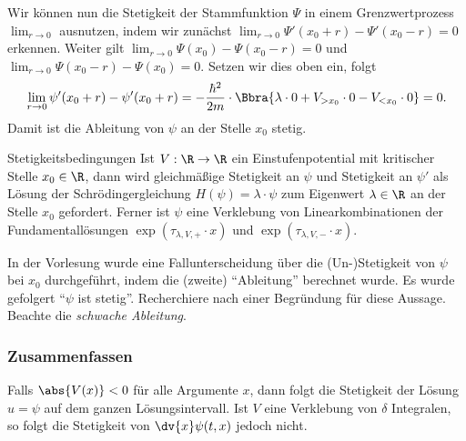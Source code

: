 \documentclass{subfiles}
\begin{document}
        Wir können nun die Stetigkeit der Stammfunktion $\Psi$ in einem Grenzwertprozess $\lim_{r\to 0}$ ausnutzen, indem wir zunächst $\lim_{r\to 0}\Psi'(x_0 + r) - \Psi'(x_0 - r) = 0$ erkennen. Weiter gilt $\lim_{r\to 0}\Psi(x_0) - \Psi(x_0 - r) = 0$ und $\lim_{r\to 0}\Psi(x_0 - r) - \Psi(x_0) = 0$. Setzen wir dies oben ein, folgt 
        \[
            \lim_{r\to 0}\psi'(x_0 + r)-\psi'(x_0 + r) = -\frac{\hbar^2}{2m}\cdot\Bbra{
                \lambda\cdot 0 + V_{>x_0}\cdot 0 - V_{<x_0}\cdot 0
            } = 0.
        \]
        Damit ist die Ableitung von $\psi$ an der Stelle $x_0$ stetig.

        \begin{mdef}{Stetigkeitsbedingungen}
            Ist $V:\R\to\R$ ein Einstufenpotential mit kritischer Stelle $x_0\in\R$, dann wird gleichmäßige Stetigkeit an $\psi$ und Stetigkeit an $\psi'$ als Lösung der Schrödingergleichung $H(\psi) = \lambda\cdot\psi$ zum Eigenwert $\lambda\in\R$ an der Stelle $x_0$ gefordert. Ferner ist $\psi$ eine Verklebung von Linearkombinationen der Fundamentallösungen $\exp(\tau_{\lambda,V,+}\cdot x)$ und $\exp(\tau_{\lambda,V,-}\cdot x)$. 
        \end{mdef}


        \begin{Aufgabe}
            \nr{} In der Vorlesung wurde eine Fallunterscheidung über die (Un-)Stetigkeit von $\psi$ bei $x_0$ durchgeführt, indem die (zweite) \enquote{Ableitung} berechnet wurde. Es wurde gefolgert \enquote{$\psi$ ist stetig}. Recherchiere nach einer Begründung für diese Aussage. Beachte die \emph{schwache Ableitung}. 
        \end{Aufgabe}

    \subsubsection*{Zusammenfassen}
        Falls $\abs{V(x)}<0$ für alle Argumente $x$, dann folgt die Stetigkeit der Lösung $u = \psi$ auf dem ganzen Lösungsintervall. Ist $V$ eine Verklebung von $\delta$ Integralen, so folgt die Stetigkeit von $\dv{x}\psi(t,x)$ jedoch nicht. 
\end{document}
